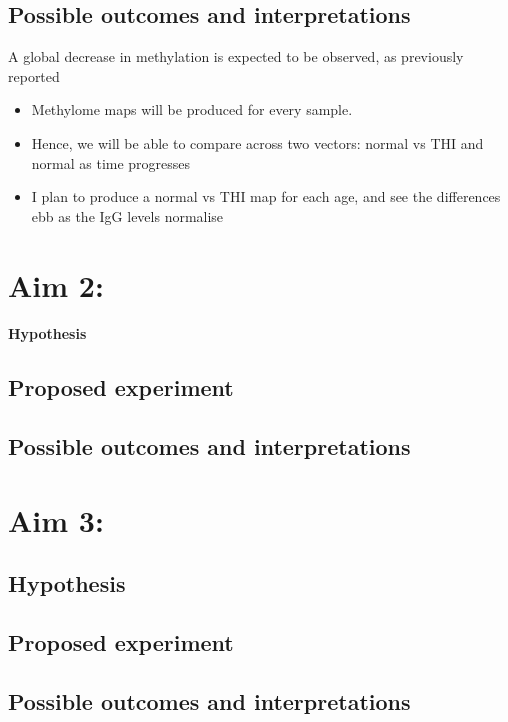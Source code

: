 \documentclass[12pt]{article}
\begin{document}
		
		\subsection{Possible outcomes and interpretations}		
			
			A global decrease in methylation is expected to be observed, as previously reported
			 \citep{Kulis15,Lai13,Kulis12,Shaknovich11} 
			\begin{itemize}
				\item Methylome maps will be produced for every sample. 
				\item Hence, we will be able to compare across two vectors: normal vs THI and normal as time progresses
				\item I plan to produce a normal vs THI map for each age, and see the differences ebb as the IgG levels normalise
			\end{itemize}
	
	\section{Aim 2:}
	
		\paragraph{Hypothesis}
		
		\subsection{Proposed experiment}
		
		\subsection{Possible outcomes and interpretations}		
		
	\section{Aim 3:}
	
		\subsection{Hypothesis}
		
		\subsection{Proposed experiment}
		
		\subsection{Possible outcomes and interpretations}				
	
\end{document}
